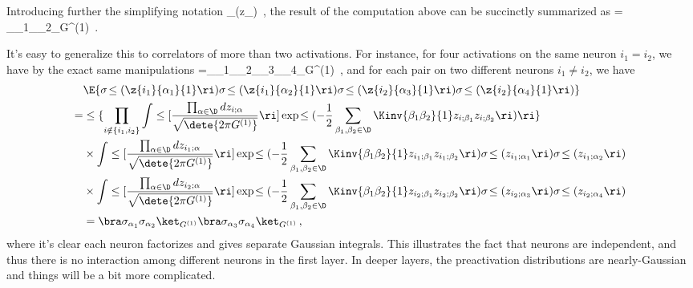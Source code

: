 Introducing further the simplifying notation
\be
\sigma_{\alpha}\equiv \sigma\!\le(z_{\alpha}\ri)\, ,
\ee
the result of the computation above can be succinctly summarized as
\be\label{eq:two-activations-Gauss}
= \bra \sigma_{\alpha_1}\sigma_{\alpha_2}\ket_{G^{(1)}}\, .
\ee

It's easy to generalize this to correlators of more than two activations. For instance, for four activations on the same neuron $i_1=i_2$, we have by the exact same manipulations
\be\label{eq:four-activations-one-neuron-Gauss} 
=\bra \sigma_{\alpha_1}\sigma_{\alpha_2}\sigma_{\alpha_3}\sigma_{\alpha_4}\ket_{G^{(1)}}\, ,
\ee
and for each pair on two different neurons $i_1\ne i_2$, we have
\begin{align}\label{eq:four-activations-two-neurons-Gauss} 
&\E{\sigma\!\le(\z{i_1}{\alpha_1}{1}\ri)\sigma\!\le(\z{i_1}{\alpha_2}{1}\ri)\sigma\!\le(\z{i_2}{\alpha_3}{1}\ri)\sigma\!\le(\z{i_2}{\alpha_4}{1}\ri)}\, \\
=&\le\{\prod_{  i\notin \{i_1,i_2\} }\int \le[ \frac{ \prod_{\alpha\in\D} d z_{i;\alpha}}{\sqrt{\dete{2\pi G^{(1)}}}}\ri]\exp\!\le(-\frac{1}{2}\sum_{\beta_1,\beta_2\in\D}\Kinv{\beta_1 \beta_2}{1}z_{i;\beta_1}z_{i;\beta_2}\ri)\ri\}\, \nonumber\\
&\times\int \le[ \frac{\prod_{\alpha\in\D} d z_{i_1;\alpha}}{\sqrt{\dete{2\pi G^{(1)}}}}\ri]\exp\!\le(-\frac{1}{2}\sum_{\beta_1,\beta_2\in\D}\Kinv{\beta_1 \beta_2}{1}z_{i_1;\beta_1}z_{i_1;\beta_2}\ri)\sigma\!\le(z_{i_1;\alpha_1}\ri)\sigma\!\le(z_{i_1;\alpha_2}\ri)\, \nonumber\\
&\times\int \le[ \frac{\prod_{\alpha\in\D} d z_{i_2;\alpha}}{\sqrt{\dete{2\pi G^{(1)}}}}\ri]\exp\!\le(-\frac{1}{2}\sum_{\beta_1,\beta_2\in\D}\Kinv{\beta_1 \beta_2}{1}z_{i_2;\beta_1}z_{i_2;\beta_2}\ri)\sigma\!\le(z_{i_2;\alpha_3}\ri)\sigma\!\le(z_{i_2;\alpha_4}\ri)\,  \nonumber\\
&=\bra \sigma_{\alpha_1}\sigma_{\alpha_2}\ket_{G^{(1)}}\bra \sigma_{\alpha_3}\sigma_{\alpha_4}\ket_{G^{(1)}}\, , \nonumber
\end{align}
where it's clear each neuron factorizes and gives separate Gaussian integrals.
This illustrates the fact that neurons are independent, and thus there is no interaction among different neurons in the first layer.
In deeper layers, the preactivation distributions are nearly-Gaussian and things will be a bit more complicated. %



